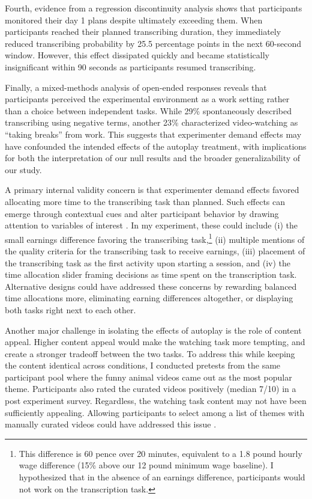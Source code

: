 \documentclass[11pt,a4paper,oneside]{article}
\begin{document}
Fourth, evidence from a regression discontinuity analysis shows that participants monitored their day 1 plans despite ultimately exceeding them. When participants reached their planned transcribing duration, they immediately reduced transcribing probability by 25.5 percentage points in the next 60-second window. However, this effect dissipated quickly and became statistically insignificant within 90 seconds as participants resumed transcribing.

Finally, a mixed-methods analysis of open-ended responses reveals that participants perceived the experimental environment as a work setting rather than a choice between independent tasks. While 29\% spontaneously described transcribing using negative terms, another 23\% characterized video-watching as ``taking breaks'' from work. This suggests that experimenter demand effects may have confounded the intended effects of the autoplay treatment, with implications for both the interpretation of our null results and the broader generalizability of our study.

A primary internal validity concern is that experimenter demand effects favored allocating more time to the transcribing task than planned. Such effects can emerge through contextual cues and alter participant behavior by drawing attention to variables of interest \citep{zizzo2010ee}. In my experiment, these could include (i) the small earnings difference favoring the transcribing task,\footnote{This difference is 60 pence over 20 minutes, equivalent to a 1.8 pound hourly wage difference (15\% above our 12 pound minimum wage baseline). I hypothesized that in the absence of an earnings difference, participants would not work on the transcription task.} (ii) multiple mentions of the quality criteria for the transcribing task to receive earnings, (iii) placement of the transcribing task as the first activity upon starting a session, and (iv) the time allocation slider framing decisions as time spent on the transcription task. Alternative designs could have addressed these concerns by rewarding balanced time allocations more, eliminating earning differences altogether, or displaying both tasks right next to each other.

Another major challenge in isolating the effects of autoplay is the role of content appeal. Higher content appeal would make the watching task more tempting, and create a stronger tradeoff between the two tasks. To address this while keeping the content identical across conditions, I conducted pretests from the same participant pool where the funny animal videos came out as the most popular theme. Participants also rated the curated videos positively (median 7/10) in a post experiment survey. Regardless, the watching task content may not have been sufficiently appealing. Allowing participants to select among a list of themes with manually curated videos could have addressed this issue \citep{ek2023too}.
\end{document}
